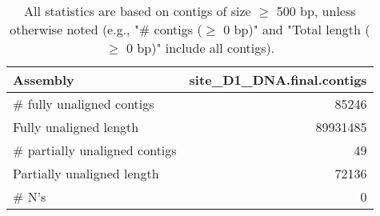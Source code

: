 \documentclass[12pt,a4paper]{article}
\begin{document}
\begin{table}[ht]
\begin{center}
\caption{All statistics are based on contigs of size $\geq$ 500 bp, unless otherwise noted (e.g., "\# contigs ($\geq$ 0 bp)" and "Total length ($\geq$ 0 bp)" include all contigs).}
\begin{tabular}{|l*{1}{|r}|}
\hline
Assembly & site\_D1\_DNA.final.contigs \\ \hline
\# fully unaligned contigs & 85246 \\ \hline
Fully unaligned length & 89931485 \\ \hline
\# partially unaligned contigs & 49 \\ \hline
Partially unaligned length & 72136 \\ \hline
\# N's & 0 \\ \hline
\end{tabular}
\end{center}
\end{table}
\end{document}

